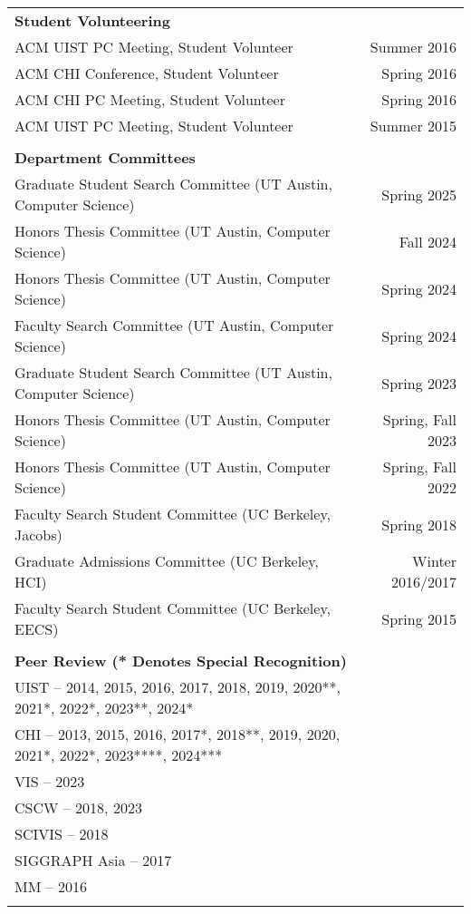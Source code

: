 \begin{longtable}{Xr}
	\textbf{Student Volunteering} &  \\
	ACM UIST PC Meeting, Student Volunteer & Summer 2016 \\
	ACM CHI Conference, Student Volunteer & Spring 2016 \\
	ACM CHI PC Meeting, Student Volunteer & Spring 2016 \\
	ACM UIST PC Meeting, Student Volunteer & Summer 2015 \\
	\\

	\textbf{Department Committees} &  \\
	Graduate Student Search Committee (UT Austin, Computer Science) & Spring 2025 \\
	Honors Thesis Committee (UT Austin, Computer Science) & Fall 2024 \\
	Honors Thesis Committee (UT Austin, Computer Science) & Spring 2024 \\
	Faculty Search Committee (UT Austin, Computer Science) & Spring 2024 \\
	Graduate Student Search Committee (UT Austin, Computer Science) & Spring 2023 \\
	Honors Thesis Committee (UT Austin, Computer Science) & Spring, Fall 2023 \\
	Honors Thesis Committee (UT Austin, Computer Science) & Spring, Fall 2022 \\
	Faculty Search Student Committee (UC Berkeley, Jacobs) & Spring 2018 \\
	Graduate Admissions Committee (UC Berkeley, HCI) & Winter 2016/2017 \\
	Faculty Search Student Committee (UC Berkeley, EECS) & Spring 2015 \\
	\\

	\textbf{Peer Review (* Denotes Special Recognition)} &  \\
	UIST -- 2014, 2015, 2016, 2017, 2018, 2019, 2020**, 2021*, 2022*, 2023**, 2024* &  \\
	CHI -- 2013, 2015, 2016, 2017*, 2018**, 2019, 2020, 2021*, 2022*, 2023****, 2024*** &  \\
	VIS -- 2023 &  \\
	CSCW -- 2018, 2023 &  \\
	SCIVIS -- 2018 &  \\
	SIGGRAPH Asia -- 2017 &  \\
	MM -- 2016 &  \\
	\\


\end{longtable}
